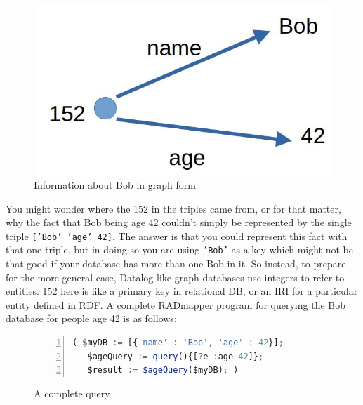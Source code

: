 \documentclass[10pt,letterpaper]{article} %
\newcommand{\stt}[1]{\texttt{#1}} %
\begin{document}
\begin{figure}[H]
  \caption{Information about Bob in graph form}
  \label{fig:bob-as-a-graph}
     \includegraphics[scale=0.15]{bob-age-42.jpg}
  \centering
\end{figure}

You might wonder where the 152 in the triples came from, or for that matter, why the fact that Bob being age 42 couldn't
simply be represented by the single triple \stt{['Bob' 'age' 42]}.
The answer is that you could represent this fact with that one triple, but in doing so you are using \stt{'Bob'} as a key
which might not be that good if your database has more than one Bob in it.
So instead, to prepare for the more general case, Datalog-like graph databases use integers to refer to entities.
152 here is like a primary key in relational DB, or an IRI for a particular entity defined in RDF.
A complete RADmapper program for querying the Bob database for people age 42 is as follows:

\begin{figure}[H]
  \caption{A complete query}
  \label{code:bob-age}
\begin{lstlisting}[language=JavaScript,numberstyle=\scriptsize,basicstyle=\ttfamily\scriptsize,numbers=left,stepnumber=1,breaklines=true]
 ( $myDB := [{'name' : 'Bob', 'age' : 42}];
   $ageQuery := query(){[?e :age 42]};
   $result := $ageQuery($myDB); )
\end{lstlisting}
\end{figure} \vspace{-2em}

\end{document}
